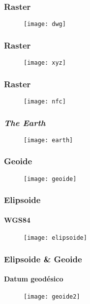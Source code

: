 \documentclass[14pt]{beamer}
\begin{document}
\begin{frame}
\frametitle{Raster}
  \begin{figure}
    \centering
    \texttt{[image: dwg]}
  \end{figure}
\end{frame}
\begin{frame}
\frametitle{Raster}
  \begin{figure}
    \centering
    \texttt{[image: xyz]}
  \end{figure}
\end{frame}
\begin{frame}
\frametitle{Raster}
  \begin{figure}
    \centering
    \texttt{[image: nfc]}
  \end{figure}
\end{frame}
\begin{frame}
\frametitle{\emph{The Earth}}
  \begin{figure}
    \centering
    \texttt{[image: earth]}
  \end{figure}
\end{frame}
\begin{frame}
\frametitle{Geoide}
  \begin{figure}
    \centering
    \texttt{[image: geoide]}
  \end{figure}
\end{frame}
\begin{frame}
\frametitle{Elipsoide}
\framesubtitle{WGS84}
  \begin{figure}
    \centering
    \texttt{[image: elipsoide]}
  \end{figure}
\end{frame}
\begin{frame}
\frametitle{Elipsoide \& Geoide}
\framesubtitle{Datum geodésico}
  \begin{figure}
    \centering
    \texttt{[image: geoide2]}
  \end{figure}
\end{frame}
\end{document}
